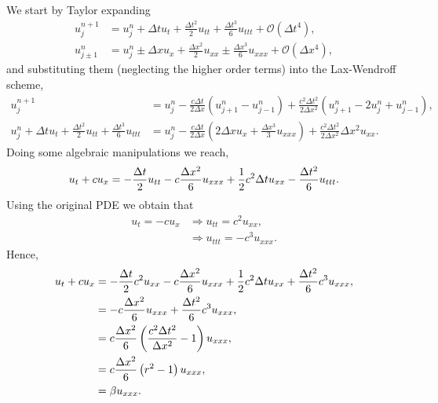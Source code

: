\begin{questions}

\begin{solution}
We start by Taylor expanding 
\begin{align*}
u^{n+1}_j&=u_j^n+\Delta t u_t+\frac{\Delta t^2}{2} u_{tt}+\frac{\Delta t^3}{6} u_{ttt}+\mathcal{O}(\Delta t^4),\\
u^{n}_{j\pm 1}&=u_j^n\pm\Delta x u_x+\frac{\Delta x^2}{2} u_{xx}\pm\frac{\Delta x^3}{6} u_{xxx}+\mathcal{O}(\Delta x^4),
\end{align*}
and substituting them (neglecting the higher order terms) into the Lax-Wendroff scheme,
\begin{align*}
u_j^{n+1}&=u_j^n-\frac{c\Delta t}{2\Delta x}\left(u^n_{j+1}-u^n_{j-1}\right)+\frac{c^2\Delta t^2}{2\Delta x^2}\left(u^n_{j+1}-2u^n_{j}+u^n_{j-1}\right),\\
u_j^n+\Delta t u_t+\frac{\Delta t^2}{2} u_{tt}+\frac{\Delta t^3}{6} u_{ttt}&=u_j^n-\frac{c\Delta t}{2\Delta x}\left(2\Delta x u_x+\frac{\Delta x^3}{3} u_{xxx}\right)+\frac{c^2\Delta t^2}{2\Delta x^2}\Delta x^2 u_{xx}.
\end{align*}
Doing some algebraic manipulations we reach,
\begin{align*}
u_t+cu_x=-\frac{\Delta t}{2} u_{tt}-c\frac{\Delta x^2}{6}u_{xxx}+\frac{1}{2} c^2\Delta t u_{xx}-\frac{\Delta t^2}{6}u_{ttt}.
\end{align*}
Using the original PDE we obtain that
\begin{align*}
u_t=-cu_x&\Rightarrow u_{tt}=c^2u_{xx},\\
&\Rightarrow u_{ttt}=-c^3u_{xxx}.
\end{align*}
Hence,
\begin{align*}
u_t+cu_x&=-\frac{\Delta t}{2} c^2u_{xx}-c\frac{\Delta x^2}{6}u_{xxx}+\frac{1}{2} c^2\Delta t u_{xx}+\frac{\Delta t^2}{6}c^3u_{xxx},\\
&=-c\frac{\Delta x^2}{6}u_{xxx}+\frac{\Delta t^2}{6}c^3u_{xxx},\\
&=c\frac{\Delta x^2}{6}\left(\frac{c^2\Delta t^2}{\Delta x^2} -1\right)u_{xxx},\\
&=c\frac{\Delta x^2}{6}\left(r^2 -1\right)u_{xxx},\\
&=\beta u_{xxx}.
\end{align*}
\end{solution}
\end{questions}
